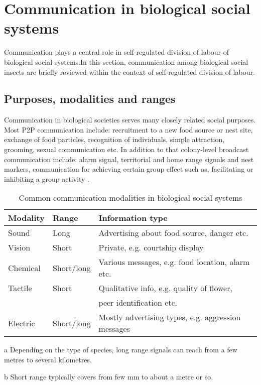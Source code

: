\section{Communication in biological social systems}
\label{bg:bio-comm}
Communication plays a central role in self-regulated division of labour of biological social systems.In this section, communication among biological social insects are briefly reviewed within the context of self-regulated  division of labour.

\subsection{Purposes, modalities and ranges}
Communication in biological societies serves many closely related social purposes. Most P2P communication include: recruitment to a new food source or nest site, exchange of food particles, recognition of individuals, simple attraction, grooming, sexual communication etc. In addition to that colony-level broadcast communication include: alarm signal, territorial and home range signals and nest markers, communication for achieving certain group effect such as, facilitating or inhibiting  a group activity \cite{Holldobler1990}.\\
\begin{table}
\caption{Common communication modalities in biological social systems}
\label{table:bio-comm-modalities}
\begin{center}
\begin{threeparttable}
\begin{tabular}{|l|l|l|}
\hline \textbf{Modality} & \textbf{Range} & \textbf{Information type}\\
\hline Sound & Long\tnote{a} & Advertising about food  source,  danger etc. \\                                                                                                                                               
\hline Vision & Short\tnote{b}  & Private, e.g. courtship display \\
\hline Chemical  & Short/long & Various messages, e.g. food location, alarm etc.\\
\hline Tactile & Short & Qualitative info, e.g. quality of flower,\\ & & peer identification etc.\\
\hline Electric & Short/long & Mostly advertising types, e.g. aggression messages\\
\hline
\end{tabular}
\begin{tablenotes}
\item [a]Depending on the type of species, long range signals can reach from a few metres to several kilometres.
\item [b]Short range typically covers from few mm to about a metre or so.
\end{tablenotes}
\end{threeparttable}
\end{center}
\end{table}
